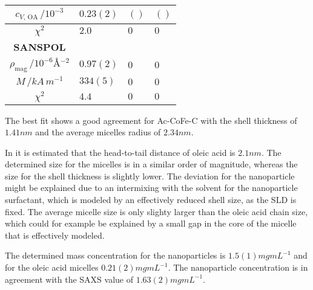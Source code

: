\documentclass[\main/dresen_thesis.tex]{subfiles}
\begin{document}
\begin{table}[ht]
\begin{tabular}{ c | l | l | l }
        \rule{0pt}{2ex} $c_{V, \, \mathrm{OA}} \, / \unit{10^{-3}}$      & $0.23(2)$ & $()$       & $()$\\
        \hline
        \rule{0pt}{2ex} $\chi^2$                                          & $2.0$          & $0$        & $0$\\
        \hline
        \textbf{SANSPOL}\\
        \hline
        \rule{0pt}{2ex} $\rho_\mathrm{mag} \, / \unit{10^{-6} \angstrom^{-2}}$   & $0.97(2)$    & $0$ & $0$\\
        \rule{0pt}{2ex} $M \, / \unit{kA \,m^{-1}}$                       & $334(5)$     & $0$ & $0$\\
        \hline
        \rule{0pt}{2ex} $\chi^2$                                          & $4.4$          & $0$        & $0$\\
      \end{tabular}
    \end{table}

    The best fit shows a good agreement for Ac-CoFe-C with the shell thickness of $1.41 \unit{nm}$ and the average micelles radius of $2.34 \unit{nm}$.

    In \cite{Disch_2010_Thesp} it is estimated that the head-to-tail distance of oleic acid is $2.1 \unit{nm}$.
    The determined size for the micelles is in a similar order of magnitude, whereas the size for the shell thickness is slightly lower.
    The deviation for the nanoparticle might be explained due to an intermixing with the solvent for the nanoparticle surfactant, which is modeled by an effectively reduced shell size, as the SLD is fixed.
    The average micelle size is only slighty larger than the oleic acid chain size, which could for example be explained by a small gap in the core of the micelle that is effectively modeled.

    The determined mass concentration for the nanoparticles is $1.5(1) \unit{mg mL^{-1}}$ and for the oleic acid micelles $0.21(2) \unit{mg mL^{-1}}$.
    The nanoparticle concentration is in agreement with the SAXS value of $1.63(2) \unit{mg mL^{-1}}$.





\end{document}

